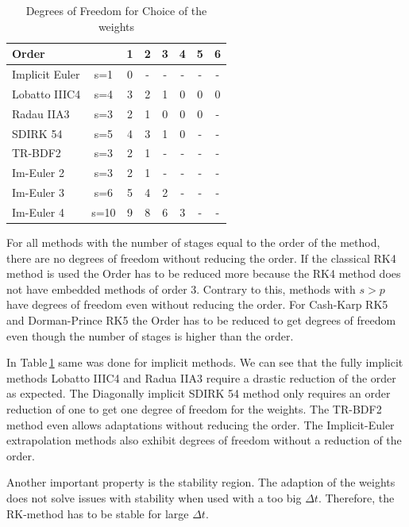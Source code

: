 \documentclass[a4paper]{article}
\numberwithin{equation}{section}
\theoremstyle{plain}
\theoremstyle{definition}
\numberwithin{theorem}{section}
\newcommand{\dt}{{\Delta t}}
\newcommand{\1}{\mathbbm{1}}
\begin{document}
 \begin{table}[h!]
\centering   %
\begin{tabular}{|l c|c c c c c c |} 
 \hline 
Order & &1&2&3&4&5&6 \\ 
 \hline Implicit Euler& s=1&0& - & - & - & - & -  \\ 
 Lobatto IIIC4& s=4&3&2&1&0&0&0 \\ 
 Radau IIA3& s=3&2&1&0&0&0& -  \\ 
 SDIRK 54& s=5&4&3&1&0& - & -  \\ 
 TR-BDF2& s=3&2&1& - & - & - & -  \\ 
 Im-Euler 2& s=3&2&1& - & - & - & -  \\ 
 Im-Euler 3& s=6&5&4&2& - & - & -  \\ 
 Im-Euler 4& s=10&9&8&6&3& - & -  \\ 
 \hline 
 \end{tabular}
 \caption{Degrees of Freedom for Choice of the weights} %
 \label{table:DOF_imp}
 \end{table}


For all methods with the number of stages equal to the order of the method, there are no degrees of freedom without reducing the order.  
If the classical RK4 method is used the Order has to be reduced more because the RK4 method does not have embedded methods of order 3. 
Contrary to this, methods with $s > p$ have degrees of freedom even without reducing the order.  
For Cash-Karp RK5 and Dorman-Prince RK5 the Order has to be reduced to get degrees of freedom even though the number of stages is higher than the order. 

 
In Table\,\ref{table:DOF_imp} same was done for implicit methods. 
We can see that the fully implicit methods Lobatto IIIC4 and Radua IIA3 require a drastic reduction of the order as expected. 
The Diagonally implicit SDIRK 54 method only requires an order reduction of one to get one degree of freedom for the weights.  
The TR-BDF2 method even allows adaptations without reducing the order.  
The Implicit-Euler extrapolation methods also exhibit degrees of freedom without a reduction of the order. 

Another important property is the stability region. 
The adaption of the weights does not solve issues with stability when used with a too big $\dt$. Therefore, the RK-method has to be stable for large $\dt$. 

\end{document}
